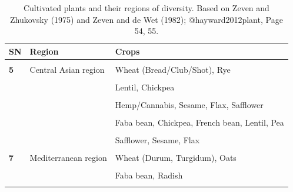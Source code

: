 \documentclass[
  ignorenonframetext,
  aspectratio=169]{beamer}
\begin{document}
\begin{frame}{}
\protect\hypertarget{section-18}{}
\begin{table}

\caption{\label{tab:diversity-region2}Cultivated plants and their regions of diversity. Based on Zeven and Zhukovsky (1975) and Zeven and de Wet (1982); @hayward2012plant, Page 54, 55.}
\centering
\fontsize{6}{8}\selectfont
\begin{tabular}[t]{>{\raggedright\arraybackslash}p{3em}>{\raggedright\arraybackslash}p{14em}>{\raggedright\arraybackslash}p{32em}}
\toprule
SN & Region & Crops\\
\midrule
\textbf{\cellcolor{gray!6}{}} & \cellcolor{gray!6}{} & \cellcolor{gray!6}{Sesame, Ginger, Turmeric, Cardamom, Arecanut, Sugarcane, Black pepper, Indigo}\\
\textbf{5} & Central Asian region & Wheat (Bread/Club/Shot), Rye\\
\textbf{\cellcolor{gray!6}{}} & \cellcolor{gray!6}{} & \cellcolor{gray!6}{Allium/Onion, Garlic, Spinach, Peas, Beetroot, Faba bean}\\
\textbf{} &  & Lentil, Chickpea\\
\textbf{\cellcolor{gray!6}{}} & \cellcolor{gray!6}{} & \cellcolor{gray!6}{Apricot, Plum, Pear, Apple, Walnut, Almond, Pistachio, Melon, Grape, Carrot, Radish}\\
\addlinespace
\textbf{} &  & Hemp/Cannabis, Sesame, Flax, Safflower\\
\textbf{\cellcolor{gray!6}{6}} & \cellcolor{gray!6}{Near Eastern region} & \cellcolor{gray!6}{Wheat (Einkorn, Durum, Poulard, Bread), Barley, Rye/Secale}\\
\textbf{} &  & Faba bean, Chickpea, French bean, Lentil, Pea\\
\textbf{\cellcolor{gray!6}{}} & \cellcolor{gray!6}{} & \cellcolor{gray!6}{Brassica oleracea, Allium, Melon, Grape, Plum, Pear, Apple, Apricot, Pistachio, Fig, Pomegranate, Almond}\\
\textbf{} &  & Safflower, Sesame, Flax\\
\addlinespace
\textbf{\cellcolor{gray!6}{}} & \cellcolor{gray!6}{} & \cellcolor{gray!6}{Lupins, Medics}\\
\textbf{7} & Mediterranean region & Wheat (Durum, Turgidum), Oats\\
\textbf{\cellcolor{gray!6}{}} & \cellcolor{gray!6}{} & \cellcolor{gray!6}{Brassica oleracea, Lettuce, Beetroot, Colza}\\
\textbf{} &  & Faba bean, Radish\\
\textbf{\cellcolor{gray!6}{}} & \cellcolor{gray!6}{} & \cellcolor{gray!6}{Olive, Trifolium/Berseem, Lupins, Crocus, Grape, Fennel, Cumin, Celery, Linseed}\\
\bottomrule
\end{tabular}
\end{table}
\end{frame}
\end{document}
